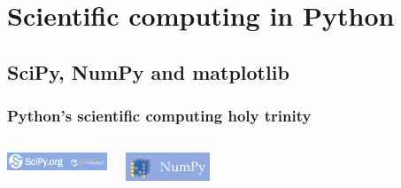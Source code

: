 \documentclass[xcolor=dvipsnames, 9pt]{beamer}
\begin{document}


\section{Scientific computing in Python} %
\label{sec:scientific_computing_in_python}

\subsection{SciPy, NumPy and matplotlib} %
\label{sub:scipy_numpy_and_matplotlib}

\begin{frame}[fragile]
    \frametitle{Python's scientific computing holy trinity}
    \begin{columns}
        \begin{center}
            \href{http://www.scipy.org}{\includegraphics[width=3cm]{../images/logos/Scipylogo.png}}
        \end{center}
        \vspace{3mm}
        \begin{center}
            \href{http://numpy.scipy.org/}{\includegraphics[clip,trim=0mm 2mm 0mm 2mm,width=2.5cm]{../images/logos/NumPy_logo.png}}

\end{center}
\end{columns}
\end{frame}
\end{document}
